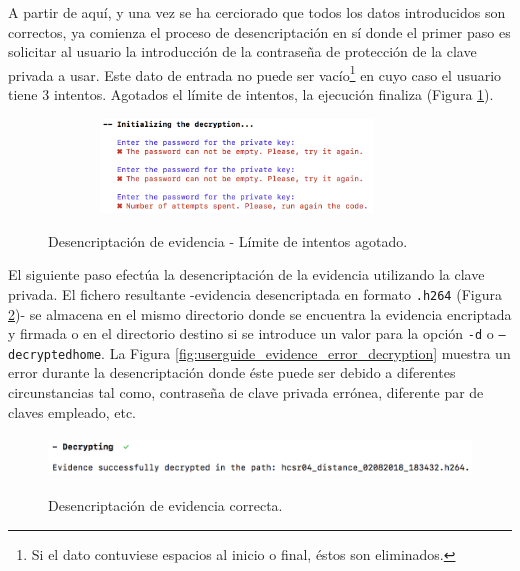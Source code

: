 \documentclass[12pt,a4paper, twoside]{report}
\begin{document}
	A partir de aquí, y una vez se ha cerciorado que todos los datos introducidos son correctos, ya comienza el proceso de desencriptación en sí donde el primer paso es solicitar al usuario la introducción de la contraseña de protección de la clave privada a usar. Este dato de entrada no puede ser vacío\footnote{Si el dato contuviese espacios al inicio o final, éstos son eliminados.} en cuyo caso el usuario tiene 3 intentos. Agotados el límite de intentos, la ejecución finaliza (Figura \ref{fig:userguide_evidence_attempts}). \\

		\begin{figure}[!ht]   
			\caption{Desencriptación de evidencia - Límite de intentos agotado.} 
			\begin{center} 					\includegraphics[width=10cm,height=2.5cm]{Images/userGuide/evidence/attempts} \\
				\label{fig:userguide_evidence_attempts} 
			\end{center}  
		\end{figure}
	
	El siguiente paso efectúa la desencriptación de la evidencia utilizando la clave privada. El fichero resultante -evidencia desencriptada en formato \texttt{.h264} (Figura \ref{fig:userguide_evidence_decryption})- se almacena en el mismo directorio donde se encuentra la evidencia encriptada y firmada o en el directorio destino si se introduce un valor para la opción \texttt{-d} o \texttt{--decryptedhome}. La Figura \ref{fig:userguide_evidence_error_decryption} muestra un error durante la desencriptación donde éste puede ser debido a diferentes circunstancias tal como, contraseña de clave privada errónea, diferente par de claves empleado, etc.

		\begin{figure}[!ht]   
			\caption{Desencriptación de evidencia correcta.} 
			\begin{center} 					\includegraphics[width=12cm,height=1.1cm]{Images/userGuide/evidence/decryption} \\
				\label{fig:userguide_evidence_decryption} 
			\end{center}  
		\end{figure}
	
\end{document}
